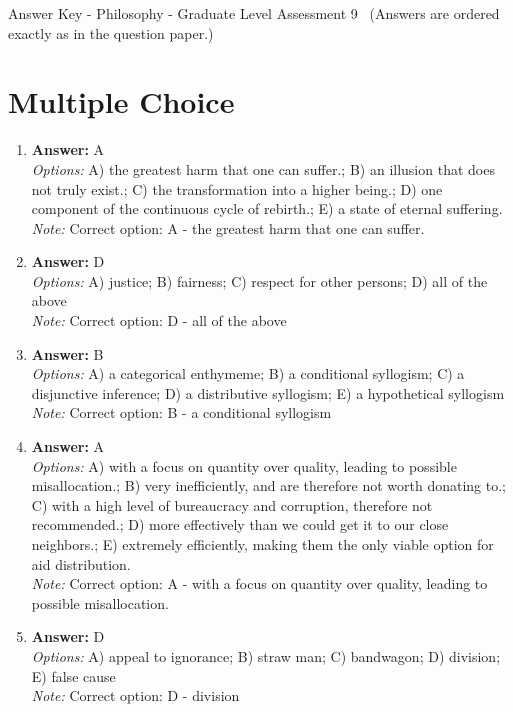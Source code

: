 \documentclass[12pt]{article}
\begin{document}
\begin{center}
Answer Key - Philosophy - Graduate Level Assessment 9 \
\small (Answers are ordered exactly as in the question paper.)
\end{center}

\section*{Multiple Choice}
\begin{enumerate}[label=\arabic*.]
\item \textbf{Answer:} A
\\ \textit{Options:} A) the greatest harm that one can suffer.; B) an illusion that does not truly exist.; C) the transformation into a higher being.; D) one component of the continuous cycle of rebirth.; E) a state of eternal suffering.
\\ \textit{Note:} Correct option: A - the greatest harm that one can suffer.
\item \textbf{Answer:} D
\\ \textit{Options:} A) justice; B) fairness; C) respect for other persons; D) all of the above
\\ \textit{Note:} Correct option: D - all of the above
\item \textbf{Answer:} B
\\ \textit{Options:} A) a categorical enthymeme; B) a conditional syllogism; C) a disjunctive inference; D) a distributive syllogism; E) a hypothetical syllogism
\\ \textit{Note:} Correct option: B - a conditional syllogism
\item \textbf{Answer:} A
\\ \textit{Options:} A) with a focus on quantity over quality, leading to possible misallocation.; B) very inefficiently, and are therefore not worth donating to.; C) with a high level of bureaucracy and corruption, therefore not recommended.; D) more effectively than we could get it to our close neighbors.; E) extremely efficiently, making them the only viable option for aid distribution.
\\ \textit{Note:} Correct option: A - with a focus on quantity over quality, leading to possible misallocation.
\item \textbf{Answer:} D
\\ \textit{Options:} A) appeal to ignorance; B) straw man; C) bandwagon; D) division; E) false cause
\\ \textit{Note:} Correct option: D - division
\end{enumerate}
\end{document}
